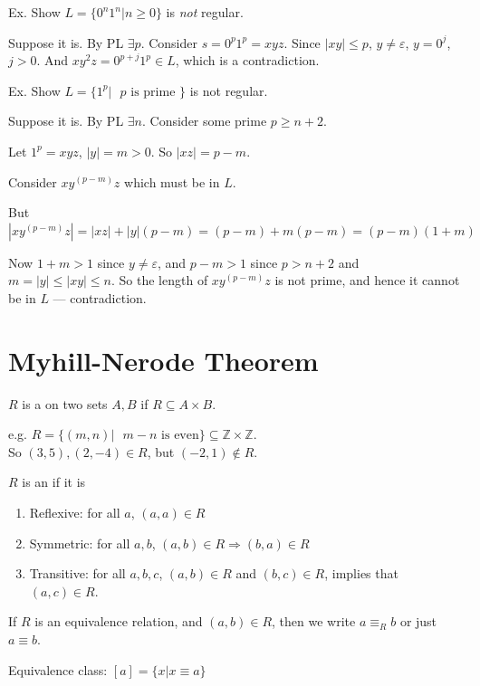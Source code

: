 \begin{frame}
Ex. Show $L=\{0^n1^n|n\ge 0\}$ is {\em not} regular.

Suppose it is.  By PL $\exists p$.  Consider $s=0^p1^p=xyz$.  Since
$|xy|\le p$, $y\neq\varepsilon$, $y=0^j$, $j>0$.  And
$xy^2z=0^{p+j}1^p\in L$, which is a contradiction.

Ex. Show $L=\{1^p|\text{ $p$ is prime }\}$ is not regular.

Suppose it is.  By PL $\exists n$.  Consider some prime $p\geq n+2$. 

Let $1^p=xyz$, $|y|=m>0$.  So $|xz|=p-m$.

Consider $xy^{(p-m)}z$ which must be in $L$.  

But $|xy^{(p-m)}z|=|xz|+|y|(p-m)=(p-m)+m(p-m)=(p-m)(1+m)$

Now $1+m>1$ since $y\neq\varepsilon$, and $p-m>1$ since $p>n+2$ and
$m=|y|\le|xy|\le n$.  
So the length of $xy^{(p-m)}z$ is not prime, and
hence it cannot be in $L$ --- contradiction.
\end{frame}

\section{Myhill-Nerode Theorem}

\begin{frame}
$R$ is a  on two sets $A,B$ if
$R\subseteq A\times B$.

e.g. $R=\{(m,n)|\text{ $m-n$ is even
}\}\subseteq\mathbb{Z}\times\mathbb{Z}$. \\
So $(3,5),(2,-4)\in R$, but $(-2,1)\notin R$.

$R$ is an  if it is
\begin{enumerate}
\item  Reflexive: for all $a$, $(a,a)\in R$
\item  Symmetric: for all $a,b$, $(a,b)\in R\Rightarrow(b,a)\in R$
\item  Transitive: for all $a,b,c$, $(a,b)\in R$ and $(b,c)\in R$,
implies that $(a,c)\in R$.
\end{enumerate}
If $R$ is an equivalence relation, and $(a,b)\in R$, then we write
$a\equiv_R b$ or just $a\equiv b$.

Equivalence class: $[a]=\{x|x\equiv a\}$
\end{frame}

